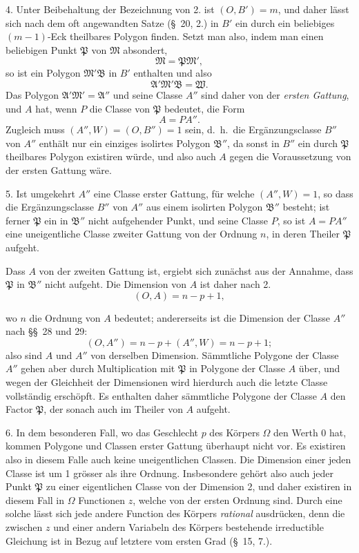 \documentclass{article}
\begin{document}
4. Unter Beibehaltung der Bezeichnung von 2. ist $(O, B') = m$, und daher lässt sich nach dem oft angewandten Satze (§~20, 2.) in $B'$ ein durch ein beliebiges $(m-1)$-Eck theilbares Polygon finden. Setzt man also, indem man einen beliebigen Punkt $\mathfrak{P}$ von $\mathfrak{M}$ absondert,
\[ \mathfrak{M} = \mathfrak{P}\mathfrak{M}', \]
so ist ein Polygon $\mathfrak{M}'\mathfrak{B}$ in $B'$ enthalten und also
\[ \mathfrak{A}'\mathfrak{M}'\mathfrak{B} = \mathfrak{W}. \]
Das Polygon $\mathfrak{A}'\mathfrak{M}' = \mathfrak{A}''$ und seine Classe $A''$ sind daher von der \emph{ersten Gattung}, und $A$ hat, wenn $P$ die Classe von $\mathfrak{P}$ bedeutet, die Form
\[ A = PA''. \]
Zugleich muss $(A'', W) = (O, B'') = 1$ sein, d.\ h.\ die Ergänzungsclasse $B''$ von $A''$ enthält nur ein einziges isolirtes Polygon $\mathfrak{B}''$, da sonst in $B''$ ein durch $\mathfrak{P}$ theilbares Polygon existiren würde, und also auch $A$ gegen die Voraussetzung von der ersten Gattung wäre.

5. Ist umgekehrt $A''$ eine Classe erster Gattung, für welche $(A'', W) = 1$, so dass die Ergänzungsclasse $B''$ von $A''$ aus einem isolirten Polygon $\mathfrak{B}''$ besteht; ist ferner $\mathfrak{P}$ ein in $\mathfrak{B}''$ nicht aufgehender Punkt, und seine Classe $P$, so ist $A = PA''$ eine uneigentliche Classe zweiter Gattung von der Ordnung $n$, in deren Theiler $\mathfrak{P}$ aufgeht.

Dass $A$ von der zweiten Gattung ist, ergiebt sich zunächst aus der Annahme, dass $\mathfrak{P}$ in $\mathfrak{B}''$ nicht aufgeht. Die Dimension von $A$ ist daher nach 2.
\[ (O, A) = n-p+1, \]

wo $n$ die Ordnung von $A$ bedeutet; andererseits ist die Dimension der Classe $A''$ nach §§~28 und 29:
\[ (O, A'') = n-p+(A'', W) = n-p+1; \]
also sind $A$ und $A''$ von derselben Dimension. Sämmtliche Polygone der Classe $A''$ gehen aber durch Multiplication mit $\mathfrak{P}$ in Polygone der Classe $A$ über, und wegen der Gleichheit der Dimensionen wird hierdurch auch die letzte Classe vollständig erschöpft. Es enthalten daher sämmtliche Polygone der Classe $A$ den Factor $\mathfrak{P}$, der sonach auch im Theiler von $A$ aufgeht.

6. In dem besonderen Fall, wo das Geschlecht $p$ des Körpers $\Omega$ den Werth 0 hat, kommen Polygone und Classen erster Gattung überhaupt nicht vor. Es existiren also in diesem Falle auch keine uneigentlichen Classen. Die Dimension einer jeden Classe ist um 1 grösser als ihre Ordnung. Insbesondere gehört also auch jeder Punkt $\mathfrak{P}$ zu einer eigentlichen Classe von der Dimension 2, und daher existiren in diesem Fall in $\Omega$ Functionen $z$, welche von der ersten Ordnung sind. Durch eine solche lässt sich jede andere Function des Körpers \emph{rational} ausdrücken, denn die zwischen $z$ und einer andern Variabeln des Körpers bestehende irreductible Gleichung ist in Bezug auf letztere vom ersten Grad (§~15, 7.).
\end{document}
